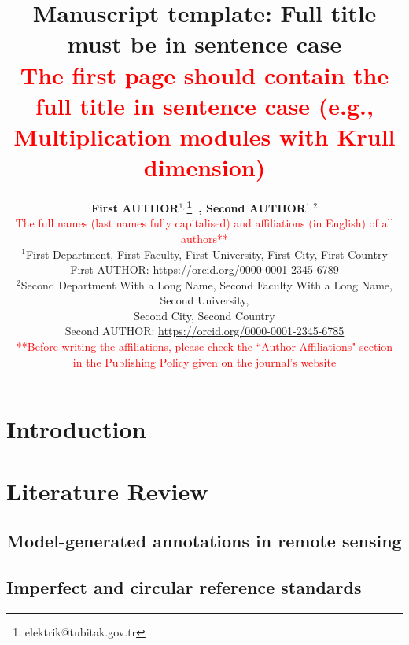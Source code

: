 \documentclass{elektr}
\title{
Manuscript template: Full title must be in sentence case \\
\textcolor{red}{\footnotesize The first page should contain the full title in sentence case (e.g., Multiplication modules with Krull dimension)}
}
\author[AUTHOR and AUTHOR]{
	\textbf{First AUTHOR$^{1,}$\thanks{elektrik@tubitak.gov.tr}~, Second AUTHOR$^{1,2}$}\\
	\textcolor{red}{The full names (last names fully capitalised) and affiliations (in English) of all authors**}\\
	$^{1}$First Department, First Faculty, First University, First City, First Country\\ 	First AUTHOR: \url{https://orcid.org/0000-0001-2345-6789} \\
	$^{2}$Second Department With a Long Name, Second Faculty With a Long Name, Second University,\\ Second City, Second Country\\ Second AUTHOR: \url{https://orcid.org/0000-0001-2345-6785}\\
	\textcolor{red}{**Before writing the affiliations, please check the ``Author Affiliations" section}\\
	\textcolor{red}{in the Publishing Policy given on the journal’s website}\\ [1.8em]

\rec{...}
\acc{...}
\finv{...}
}
\begin{document}
	\maketitle


	\begin{abstract}

	\end{abstract}

\section*{Introduction}  \label{sec:intro}

\section*{Literature Review} \label{sec:literature}

\subsection*{Model-generated annotations in remote sensing}

\subsection*{Imperfect and circular reference standards}
\end{document}
